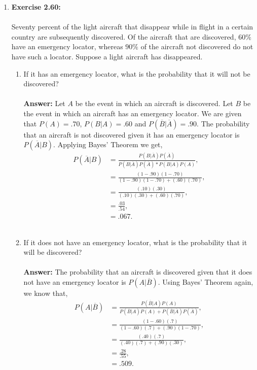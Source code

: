 \documentclass[12pt]{article}
\theoremstyle{homework}
\begin{document}
\begin{enumerate}
\item\hspace{.5in}\textbf{Exercise 2.60:} \\
\\
Seventy percent of the light aircraft that disappear while in flight in a certain country are subsequently discovered. Of the aircraft that are discovered, $60\%$ have an emergency locator, whereas $90\%$ of the aircraft not discovered do not have such a locator. Suppose a light aircraft has disappeared.
\begin{enumerate}
\item If it has an emergency locator, what is the probability that it will not be discovered?\\
\\
 \textbf{Answer:} Let $A$ be the event in which an aircraft is discovered. Let $B$ be the event in which an aircraft has an emergency locator. We are 
 given that $P(A) = .70$, $P(B|A) = .60$ and $P(\overline{B}|\overline{A}) = .90$. The probability that an aircraft is not discovered given it has an emergency locator is $P(\overline{A}|B)$. Applying Bayes' Theorem we get,
 \begin{align*}
  P(\overline{A}|B) &= \frac{P(B|\overline{A})P(\overline{A})}{P(B|\overline{A})P(\overline{A})*P(B|A)P(A)},\\
 &= \frac{(1 - .90)(1 - .70)}{(1 - .90)(1 - .70)+(.60)(.70)},\\
 &= \frac{(.10)(.30)}{(.10)(.30)+(.60)(.70)},\\
 &= \frac{.03}{.54},\\
 &= .067.
 \end{align*}
 \\
\item If it does not have an emergency locator, what is the probability that it will be discovered?\\
\\
 \textbf{Answer:} The probability that an aircraft is discovered given that it does not have an emergency locator is $P(A|\overline{B})$. Using Bayes' Theorem again, we know that,
 \begin{align*}
   P(A|\overline{B}) &= \frac{P(\overline{B}|A)P(A)}{P(\overline{B}|A)P(A)+P(\overline{B}|\overline{A})P(\overline{A})},\\
   &= \frac{(1 - .60)(.7)}{(1 - .60)(.7)+(.90)(1-.70)},\\
   &= \frac{(.40)(.7)}{(.40)(.7)+(.90)(.30)},\\
   &= \frac{.28}{.55},\\
   &= .509.\\
 \end{align*}
 \\
\end{enumerate}
\vspace{1in}



\end{enumerate}
\end{document}
